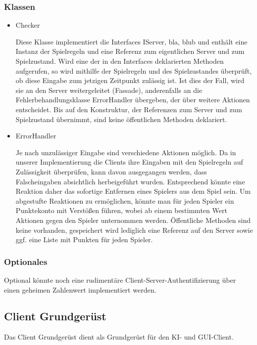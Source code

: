 \documentclass[a4paper,10pt]{article}
\begin{document}
\subsubsection{Klassen}
\begin{itemize}
\item Checker

Diese Klasse implementiert die Interfaces IServer, bla, blub und enthält eine Instanz der Spielregeln und eine Referenz zum eigentlichen Server und zum Spielzustand. Wird eine der in den Interfaces deklarierten Methoden aufgerufen, so wird mithilfe der Spielregeln und des Spielzustandes überprüft, ob diese Eingabe zum jetzigen Zeitpunkt zulässig ist. Ist dies der Fall, wird sie an den Server weitergeleitet (Fassade), anderenfalls an die Fehlerbehandlungsklasse ErrorHandler übergeben, der über weitere Aktionen entscheidet. Bis auf den Konstruktur, der Referenzen zum Server und zum Spielzustand übernimmt, sind keine öffentlichen Methoden deklariert. 
\item ErrorHandler

Je nach unzulässiger Eingabe sind verschiedene Aktionen möglich. Da in unserer Implementierung die Clients ihre Eingaben mit den Spielregeln auf Zulässigkeit überprüfen, kann davon ausgegangen werden, dass Falscheingaben absichtlich herbeigeführt wurden. Entsprechend könnte eine Reaktion daher das sofortige Entfernen eines Spielers aus dem Spiel sein. Um abgestufte Reaktionen zu ermöglichen, könnte man für jeden Spieler ein Punktekonto mit Verstößen führen, wobei ab einem bestimmten Wert Aktionen gegen den Spieler unternommen werden. Öffentliche Methoden sind keine vorhanden, gespeichert wird lediglich eine Referenz auf den Server sowie ggf. eine Liste mit Punkten für jeden Spieler.
\end{itemize}
\subsubsection{Optionales}
Optional könnte noch eine rudimentäre Client-Server-Authentifizierung über einen geheimen Zahlenwert implementiert werden.


\subsection{Client Grundgerüst}
Das Client Grundgerüst dient als Grundgerüst für den KI- und GUI-Client.
\end{document}
